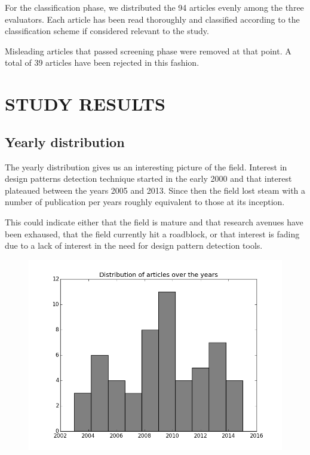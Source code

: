 \documentclass[letterpaper, 10 pt, conference]{ieeeconf}  %
\begin{document}
For the classification phase, we distributed the 94 articles evenly among the
three evaluators.
Each article has been read thoroughly and classified according to the
classification scheme if considered relevant to the study.

Misleading articles that passed screening phase were removed at that point.
A total of 39 articles have been rejected in this fashion.



\section{STUDY RESULTS}

\subsection{Yearly distribution}

The yearly distribution gives us an interesting picture of the field.
Interest in design patterns detection technique started in the early
2000 and that interest plateaued between the years 2005 and 2013.
Since then the field lost steam with a number of publication per years
roughly equivalent to those at its inception.

This could indicate either that the field is mature and that research avenues
have been exhaused, that the field currently hit a roadblock, or that interest
is fading due to a lack of interest in the need for design pattern detection
tools.

\begin{figure}
  \centering
  \includegraphics[scale=0.450]{year_distribution.png}
  \caption{}
\end{figure}
\end{document}
